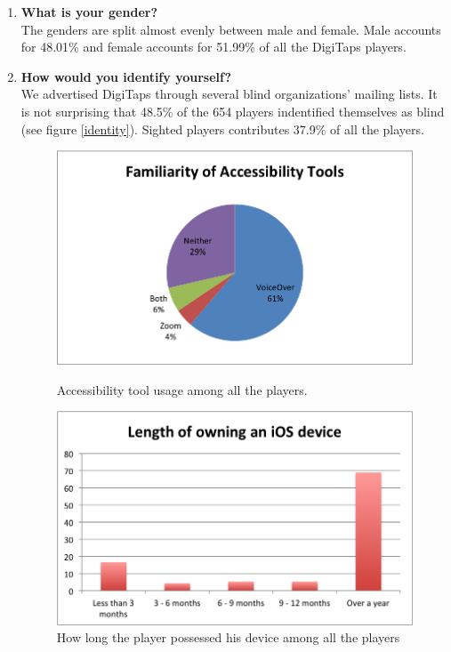 \begin{enumerate}
  \item \textbf{What is your gender?} \\
  The genders are split almost evenly between male and female. Male accounts for 48.01\% and female accounts for 51.99\% of all the DigiTaps players.

  \item \textbf{How would you identify yourself?} \\
  We advertised DigiTaps through several blind organizations' mailing lists. It is not surprising that 48.5\% of the 654 players indentified themselves as blind (see figure \ref{identity}). Sighted players contributes 37.9\% of all the players.

\begin{figure}[!htbp]
  \centering
  \includegraphics[width=1.0\textwidth]{figures/chart-tools.png}
  \caption{Accessibility tool usage among all the players.}
  \label{tool}
  \includegraphics[width=1.0\textwidth]{figures/chart-own.png}
  \caption{How long the player possessed his device among all the players}
  \label{own}
\end{figure}


\end{enumerate}
